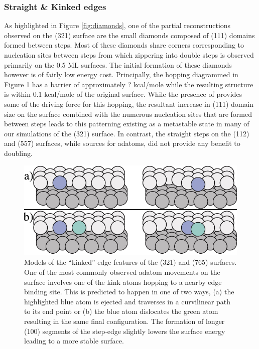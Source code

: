 \subsubsection{Straight \& Kinked edges}
As highlighted in Figure \ref{fig:diamonds}, one of the partial reconstructions
observed on the (321) surface are the small diamonds composed of (111) domains
formed between steps. Most of these diamonds share corners corresponding to
nucleation sites between steps from which zippering into double steps is
observed primarily on the 0.5 ML surfaces. The initial formation of these
diamonds however is of fairly low energy cost. Principally, the hopping
diagrammed in Figure \ref{fig:kinkSketch} has a barrier of approximately ?
kcal/mole while the resulting structure is within 0.1 kcal/mole of the original
surface. While the presence of  provides some of the driving force for
this hopping, the resultant increase in (111) domain size on the surface
combined with the numerous nucleation sites that are formed between steps leads
to this patterning existing as a metastable state in many of our simulations of
the (321) surface. In contrast, the straight steps on the (112) and (557)
surfaces, while sources for adatoms, did not provide any benefit to doubling.

\begin{figure}
  \includegraphics[width=\linewidth]{../figures/chap4/kinkMovement.pdf}
  \caption{Models of the ``kinked'' edge features of the (321) and (765)
surfaces.  One of the most commonly observed adatom movements on the surface
involves one of the kink atoms hopping to a nearby edge binding site. This is
predicted to happen in one of two ways, (a) the highlighted blue atom is
ejected and traverses in a curvilinear path to its end point or (b) the blue
atom dislocates the green atom resulting in the same final configuration. The
formation of longer (100) segments of the step-edge slightly lowers the surface
energy leading to a more stable surface.}
  \label{fig:kinkSketch}
\end{figure}

